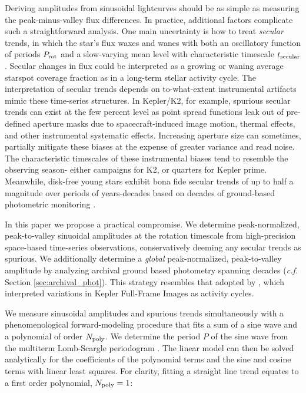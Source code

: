 \documentclass[twocolumn]{emulateapj}%
\begin{document}
Deriving amplitudes from sinusoidal lightcurves should be as simple as measuring the peak-minus-valley flux differences.  In practice, additional factors complicate such a straightforward analysis.  One main uncertainty is how to treat \emph{secular} trends, in which the star's flux waxes and wanes with both an oscillatory function of periods $P_{\rm rot}$ and a slow-varying mean level with characteristic timescale $t_{\rm secular}$.  Secular changes in flux could be interpreted as a growing or waning average starspot coverage fraction as in a long-term stellar activity cycle.  The interpretation of secular trends depends on to-what-extent instrumental artifacts mimic these time-series structures.  In Kepler/K2, for example, spurious secular trends can exist at the few percent level as point spread functions leak out of pre-defined aperture masks due to spacecraft-induced image motion, thermal effects, and other instrumental systematic effects.  Increasing aperture size can sometimes, partially mitigate these biases at the expense of greater variance and read noise.  The characteristic timescales of these instrumental biases tend to resemble the observing season- either campaigns for K2, or quarters for Kepler prime.  Meanwhile, disk-free young stars exhibit bona fide secular trends of up to half a magnitude over periods of years-decades based on decades of ground-based photometric monitoring \citep{grankin08}.

In this paper we propose a practical compromise. We determine peak-normalized, peak-to-valley sinuoidal amplitudes at the rotation timescale from high-precision space-based time-series observations, conservatively deeming any secular trends as spurious.  We additionally determine a \emph{global} peak-normalized, peak-to-valley amplitude by analyzing archival ground based photometry spanning decades (\emph{c.f.} Section \ref{sec:archival_phot}).  This strategy resembles that adopted by \citet{2017ApJ...851..116M}, which interpreted variations in Kepler Full-Frame Images as activity cycles.

We measure sinusoidal amplitudes and spurious trends simultaneously with a phenomenological forward-modeling procedure that fits a sum of a sine wave and a polynomial of order $N_{\rm poly}$.  We determine the period $P$ of the sine wave from the multiterm Lomb-Scargle periodogram \citep{ivezic14}.  The linear model can then be solved analytically for the coefficients of the polynomial terms and the sine and cosine terms with linear least squares.  For clarity, fitting a straight line trend equates to a first order polynomial, $N_{\rm poly}=1$:
\end{document}
